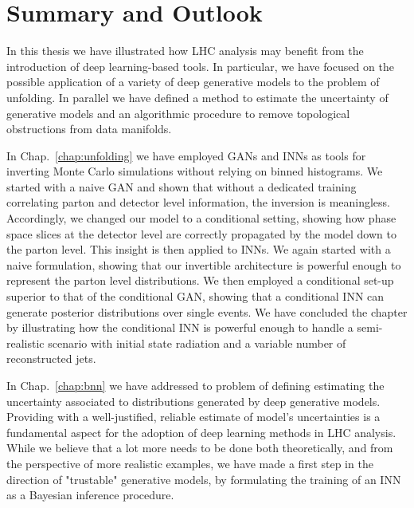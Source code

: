 %
%
%

\chapter{Summary and Outlook}\label{chap:summ}
\enlargethispage{2ex}
\vspace*{-2pt}

In this thesis we have illustrated how LHC analysis may benefit from the introduction of deep learning-based tools.
In particular, we have focused on the possible application of a variety of deep generative models to the problem of unfolding. In parallel we have defined a method to estimate the uncertainty of generative models and an algorithmic procedure to remove topological obstructions from data manifolds.

\medskip
In Chap.~\ref{chap:unfolding} we have employed GANs and INNs as tools for inverting Monte Carlo simulations without relying on binned histograms. We started with a naive GAN and shown that without a dedicated training correlating parton and detector level information, the inversion is meaningless. Accordingly, we changed our model to a conditional setting, showing how phase space slices at the detector level are correctly propagated by the model down to the parton level. This insight is then applied to INNs. We again started with a naive formulation, showing that our invertible architecture is powerful enough to represent the parton level distributions. We then employed a conditional set-up superior to that of the conditional GAN, showing that a conditional INN can generate posterior distributions over single events. We have concluded the chapter by illustrating how the conditional INN is powerful enough to handle a semi-realistic scenario with initial state radiation and a variable number of reconstructed jets.

\medskip

In Chap.~\ref{chap:bnn} we have addressed to problem of defining estimating the uncertainty associated to distributions generated by deep generative models. Providing with a well-justified, reliable estimate of model's uncertainties is a fundamental aspect for the adoption of deep learning methods in LHC analysis. While we believe that a lot more needs to be done both theoretically, and from the perspective of more realistic examples, we have made a first step in the direction of "trustable" generative models, by formulating the training of an INN as a Bayesian inference procedure.

